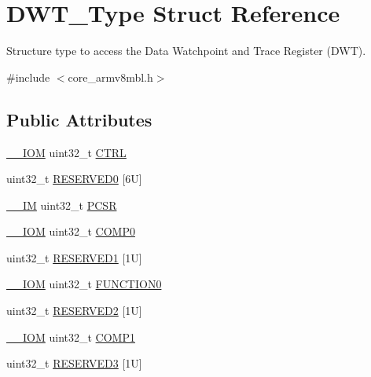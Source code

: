 \hypertarget{struct_d_w_t___type}{}\section{D\+W\+T\+\_\+\+Type Struct Reference}
\label{struct_d_w_t___type}


Structure type to access the Data Watchpoint and Trace Register (D\+WT).  




{\ttfamily \#include $<$core\+\_\+armv8mbl.\+h$>$}

\subsection*{Public Attributes}
\begin{DoxyCompactItemize}
\item 
\hyperlink{core__sc300_8h_ab6caba5853a60a17e8e04499b52bf691}{\+\_\+\+\_\+\+I\+OM} uint32\+\_\+t \hyperlink{struct_d_w_t___type_add790c53410023b3b581919bb681fe2a}{C\+T\+RL}
\item 
uint32\+\_\+t \hyperlink{struct_d_w_t___type_a383c3272908da383b6e23a059007f728}{R\+E\+S\+E\+R\+V\+E\+D0} \mbox{[}6\+U\mbox{]}
\item 
\hyperlink{core__sc300_8h_a4cc1649793116d7c2d8afce7a4ffce43}{\+\_\+\+\_\+\+IM} uint32\+\_\+t \hyperlink{struct_d_w_t___type_a6353ca1d1ad9bc1be05d3b5632960113}{P\+C\+SR}
\item 
\hyperlink{core__sc300_8h_ab6caba5853a60a17e8e04499b52bf691}{\+\_\+\+\_\+\+I\+OM} uint32\+\_\+t \hyperlink{struct_d_w_t___type_a61c2965af5bc0643f9af65620b0e67c9}{C\+O\+M\+P0}
\item 
uint32\+\_\+t \hyperlink{struct_d_w_t___type_af4ad5239d7d9b1990005f75464754594}{R\+E\+S\+E\+R\+V\+E\+D1} \mbox{[}1\+U\mbox{]}
\item 
\hyperlink{core__sc300_8h_ab6caba5853a60a17e8e04499b52bf691}{\+\_\+\+\_\+\+I\+OM} uint32\+\_\+t \hyperlink{struct_d_w_t___type_a579ae082f58a0317b7ef029b20f52889}{F\+U\+N\+C\+T\+I\+O\+N0}
\item 
uint32\+\_\+t \hyperlink{struct_d_w_t___type_a61fdbdfbc267bb6ae3b5cff18f406f2f}{R\+E\+S\+E\+R\+V\+E\+D2} \mbox{[}1\+U\mbox{]}
\item 
\hyperlink{core__sc300_8h_ab6caba5853a60a17e8e04499b52bf691}{\+\_\+\+\_\+\+I\+OM} uint32\+\_\+t \hyperlink{struct_d_w_t___type_a38714af6b7fa7c64d68f5e1efbe7a931}{C\+O\+M\+P1}
\item 
uint32\+\_\+t \hyperlink{struct_d_w_t___type_a7d29e03e23883440d96cac784c5a4958}{R\+E\+S\+E\+R\+V\+E\+D3} \mbox{[}1\+U\mbox{]}

\end{DoxyCompactItemize}
